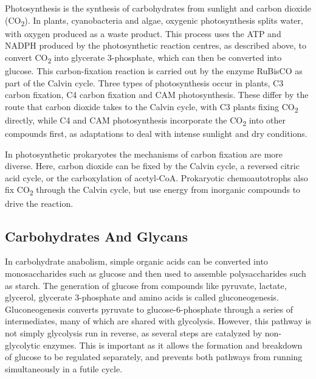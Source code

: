 Photosynthesis is the synthesis of carbohydrates from sunlight and carbon dioxide (CO\textsubscript{2}). In plants, cyanobacteria and algae, oxygenic photosynthesis splits water, with oxygen produced as a waste product. This process uses the ATP and NADPH produced by the photosynthetic reaction centres, as described above, to convert CO\textsubscript{2} into glycerate 3-phosphate, which can then be converted into glucose. This carbon-fixation reaction is carried out by the enzyme RuBisCO as part of the Calvin cycle. Three types of photosynthesis occur in plants, C3 carbon fixation, C4 carbon fixation and CAM photosynthesis. These differ by the route that carbon dioxide takes to the Calvin cycle, with C3 plants fixing CO\textsubscript{2} directly, while C4 and CAM photosynthesis incorporate the CO\textsubscript{2} into other compounds first, as adaptations to deal with intense sunlight and dry conditions.

In photosynthetic prokaryotes the mechanisms of carbon fixation are more diverse. Here, carbon dioxide can be fixed by the Calvin cycle, a reversed citric acid cycle, or the carboxylation of acetyl-CoA. Prokaryotic chemoautotrophs also fix CO\textsubscript{2} through the Calvin cycle, but use energy from inorganic compounds to drive the reaction.

\hypertarget{carbohydrates-and-glycans}{%
\subsection{Carbohydrates And Glycans}\label{carbohydrates-and-glycans}}

In carbohydrate anabolism, simple organic acids can be converted into monosaccharides such as glucose and then used to assemble polysaccharides such as starch. The generation of glucose from compounds like pyruvate, lactate, glycerol, glycerate 3-phosphate and amino acids is called gluconeogenesis. Gluconeogenesis converts pyruvate to glucose-6-phosphate through a series of intermediates, many of which are shared with glycolysis. However, this pathway is not simply glycolysis run in reverse, as several steps are catalyzed by non-glycolytic enzymes. This is important as it allows the formation and breakdown of glucose to be regulated separately, and prevents both pathways from running simultaneously in a futile cycle.

